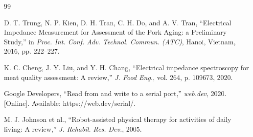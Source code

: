 \documentclass[conference]{IEEEtran}
\begin{document}
  
  \begin{thebibliography}{99}

  D. T. Trung, N. P. Kien, D. H. Tran, C. H. Do, and A. V. Tran, ``Electrical Impedance Measurement for Assessment of the Pork Aging: a Preliminary Study,'' in \textit{Proc. Int. Conf. Adv. Technol. Commun. (ATC)}, Hanoi, Vietnam, 2016, pp. 222--227.

  K. C. Cheng, J. Y. Liu, and Y. H. Chang, ``Electrical impedance spectroscopy for meat quality assessment: A review,'' \textit{J. Food Eng.}, vol. 264, p. 109673, 2020.

  Google Developers, ``Read from and write to a serial port,'' \textit{web.dev}, 2020. [Online]. Available: https://web.dev/serial/.

  M. J. Johnson et al., ``Robot-assisted physical therapy for activities of daily living: A review,'' \textit{J. Rehabil. Res. Dev.}, 2005.

  \end{thebibliography}
 

  
\end{document}
